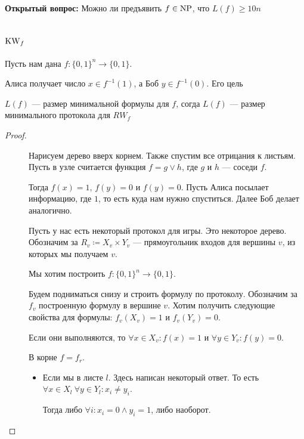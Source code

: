 \textbf{Открытый вопрос:} Можно ли предъявить $ f \in \operatorname{NP}$, что $ L(f) \ge  10n$

\section{$\operatorname{KW}_f$}

Пусть нам дана $ f\colon \{0, 1\}^{n } \to  \{0, 1\}$.

Алиса получает число $ x \in f^{-1}(1)$, а Боб $ y \in f^{-1}(0)$. Его цель %

\begin{thm}
	$ L(f) $ --- размер минимальной формулы для  $ f$, согда $ L(f)$ --- размер минимального протокола для  $ RW_f$
\end{thm}
\begin{proof}
    $ $
    \begin{description}
		\item [] Нарисуем дерево вверх корнем. Также спустим все отрицания к листьям. Пусть в узле считается функция $ f = g \vee h$, где  $ g$ и  $h$ --- соседи  $ f$.

			Тогда $ f(x) = 1$,  $ f(y) = 0$ и $ f(y) = 0$. Пусть Алиса посылает информацию, где $ 1$, то есть куда нам нужно спуститься. Далее Боб делает аналогично.%
		\item [] 
			Пусть у нас есть некоторый протокол для игры. Это некоторое дерево. Обозначим за $ R_v \coloneqq X_v \times Y_v$ --- прямоугольник входов для вершины $ v$, из которых мы получаем $ v$.

			Мы хотим построить $ f\colon \{0, 1\}^{n} \to \{0, 1\}$.

			Будем подниматься снизу и строить формулу по протоколу. Обозначим за $ f_v$ построенную формулу в вершине  $ v$. Хотим получить следующие свойства для формулы: $ f_v(X_v) = 1$ и  $ f_v(Y_v) = 0$.

			Если они выполняются, то $ \forall x \in X_v \colon f(x) = 1$ и $ \forall y \in Y_v \colon f(y) = 0$.

			В корне $ f = f_r$.

			\begin{itemize}
				\item Если мы в листе $ l$. Здесь написан некоторый ответ. То есть $ \forall x \in X_l ~\forall y \in Y_l \colon x_i \ne  y_i$.

					Тогда либо $ \forall i \colon x_i = 0 \wedge  y_i  = 1$, либо наоборот. %


\end{itemize}
\end{description}
\end{proof}
